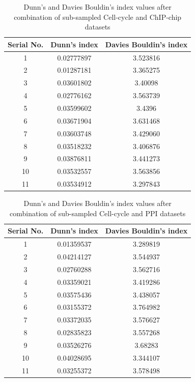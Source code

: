 \begin{table}[p]
\centering
\begin{tabular}{|c|c|c|}
\hline
Serial No. & Dunn's index  & Davies Bouldin's index\\
\hline
1 &  0.02777897 & 3.523816 \\
2 & 0.01287181 & 3.365275 \\
3 & 0.03601802 & 3.40098 \\
4 & 0.02776162 & 3.563739 \\
5 & 0.03599602 & 3.4396 \\
6 & 0.03671904 &  3.631468 \\
7 &  0.03603748 & 3.429060 \\
8 &  0.03518232 & 3.406876 \\
9 &  0.03876811 & 3.441273 \\
10 &  0.03532557 & 3.563856 \\
11 &  0.03534912 &  3.297843 \\
\hline 
\end{tabular}
\caption{Dunn's and Davies Bouldin's index values after combination of sub-sampled Cell-cycle and ChIP-chip datasets}
\label{tab:ccycle_chip_perturbed}
\end{table}

\begin{table}[p]
\centering
\begin{tabular}{|c|c|c|}
\hline
Serial No. & Dunn's index  & Davies Bouldin's index\\
\hline
1 & 0.01359537 & 3.289819 \\
2 & 0.04214127 & 3.544937 \\
3 & 0.02760288 & 3.562716 \\
4 & 0.03359021 & 3.419286 \\
5 & 0.03575436 & 3.438057 \\
6 & 0.03155372 & 3.764982 \\
7 & 0.03372035 & 3.576627 \\
8 & 0.02835823 & 3.557268 \\
9 & 0.03526276 & 3.68283 \\
10 & 0.04028695 & 3.344107 \\
11 & 0.03255372 & 3.578498 \\
\hline 
\end{tabular}
\caption{Dunn's and Davies Bouldin's index values after combination of sub-sampled Cell-cycle and PPI datasets}
\label{tab:ccycle_ppi_perturbed}
\end{table}

